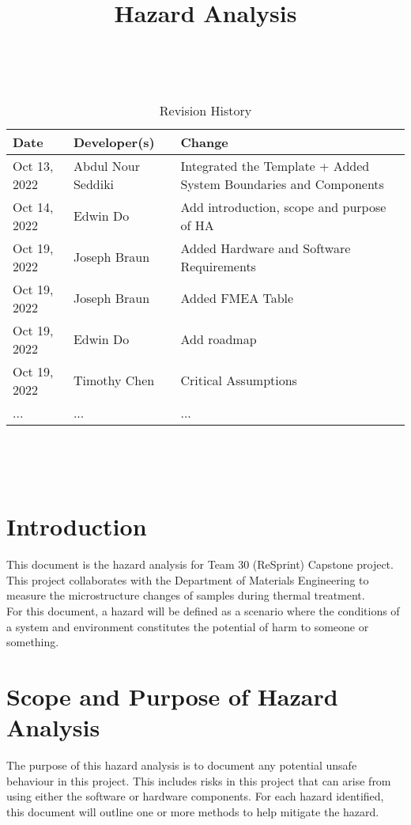 \documentclass{article}
\title{Hazard Analysis\\\progname}
\author{\authname}
\date{}
\begin{document}
\maketitle
\thispagestyle{empty}

~\newpage


\begin{table}[hp]
\caption{Revision History} \label{TblRevisionHistory}
\begin{tabularx}{\textwidth}{llX}
\toprule
\textbf{Date} & \textbf{Developer(s)} & \textbf{Change}\\
\midrule
Oct 13, 2022 & Abdul Nour Seddiki & Integrated the Template + Added System Boundaries and Components\\
Oct 14, 2022 & Edwin Do & Add introduction, scope and purpose of HA \\
Oct 19, 2022 & Joseph Braun & Added Hardware and Software Requirements \\
Oct 19, 2022 & Joseph Braun & Added FMEA Table\\
Oct 19, 2022 & Edwin Do & Add roadmap \\
Oct 19, 2022 & Timothy Chen & Critical Assumptions \\

... & ... & ...\\
\bottomrule
\end{tabularx}
\end{table}

~\newpage

\tableofcontents

~\newpage



\section{Introduction}
This document is the hazard analysis for Team 30 (ReSprint) Capstone project. 
This project collaborates with the Department of Materials Engineering to measure the microstructure changes of samples during thermal treatment.\\

\noindent For this document, a hazard will be defined as 
a scenario where the conditions of a system and environment constitutes the potential of harm to someone or something.

\section{Scope and Purpose of Hazard Analysis}
The purpose of this hazard analysis is to document any potential unsafe behaviour in this project. 
This includes risks in this project that can arise from using either the software or hardware components.
For each hazard identified, this document will outline one or more methods to help mitigate the hazard.\\
\end{document}
